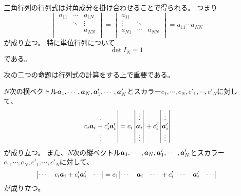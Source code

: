 \begin{proposition}[三角行列の行列式]
三角行列の行列式は対角成分を掛け合わせることで得られる。
つまり
$$
\begin{vmatrix}
a_{1 1} & \cdots & a_{1 N}\\
        & \ddots & \vdots \\
        &        & a_{N N}\\
\end{vmatrix}
=
\begin{vmatrix}
a_{1 1} &        &        \\
\vdots  & \ddots &        \\
a_{N 1} & \cdots & a_{N N}\\
\end{vmatrix}
= a_{1 1}\cdots a_{N N}
$$
が成り立つ。
特に単位行列について
$$
\det I_N = 1
$$
である。
\end{proposition}

次の二つの命題は行列式の計算をする上で重要である。

\begin{proposition}[多重線形性]
$N$次の横ベクトル$\vb*{a}_1, \cdots, \vb*{a}_N, \vb*{a}'_1, \cdots, \vb*{a}'_N$とスカラー$c_1, \cdots, c_N, c'_1, \cdots, c'_N$に対して、
$$
\begin{vmatrix}\vdots \\ c_i\vb*{a}_i+c'_i\vb*{a}'_i \\ \vdots\end{vmatrix}
= c_i\begin{vmatrix}\vdots \\ \vb*{a}_i \\ \vdots\end{vmatrix}+c'_i\begin{vmatrix}\vdots \\ \vb*{a}'_i \\ \vdots\end{vmatrix}
$$
が成り立つ。
また、$N$次の縦ベクトル$\vb*{a}_1, \cdots, \vb*{a}_N, \vb*{a}'_1, \cdots, \vb*{a}'_N$とスカラー$c_1, \cdots, c_N, c'_1, \cdots, c'_N$に対して、
$$
\begin{vmatrix}\cdots & c_i\vb*{a}_i+c'_i\vb*{a}'_i & \cdots\end{vmatrix}
= c_i\begin{vmatrix}\cdots & \vb*{a}_i & \cdots\end{vmatrix}+c'_i\begin{vmatrix}\cdots & \vb*{a}'_i & \cdots\end{vmatrix}
$$
が成り立つ。
\end{proposition}

